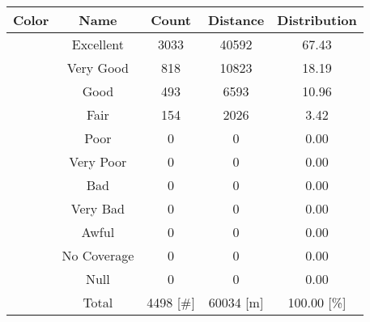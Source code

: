 \begin{tabular}{|c|c|c|c|c|}\hline
\rowcolor{Plum!20}
Color&Name&Count&Distance&Distribution\\\hline\hline
\cellcolor[HTML]{00703c} &Excellent&3033&40592&67.43\\\hline
\cellcolor[HTML]{00a032} &Very Good&818&10823&18.19\\\hline
\cellcolor[HTML]{00d228} &Good&493&6593&10.96\\\hline
\cellcolor[HTML]{ffff00} &Fair&154&2026&3.42\\\hline
\cellcolor[HTML]{ffaa00} &Poor&0&0&0.00\\\hline
\cellcolor[HTML]{fa6400} &Very Poor&0&0&0.00\\\hline
\cellcolor[HTML]{ff0000} &Bad&0&0&0.00\\\hline
\cellcolor[HTML]{dc143c} &Very Bad&0&0&0.00\\\hline
\cellcolor[HTML]{820000} &Awful&0&0&0.00\\\hline
\cellcolor[HTML]{aaaaaa} &No Coverage&0&0&0.00\\\hline
\cellcolor[HTML]{000000} &Null&0&0&0.00\\\hline
\cellcolor[HTML]{ffffff} &Total&4498 [\#]&60034 [m]&100.00 [\%]\\\hline
\end{tabular}
